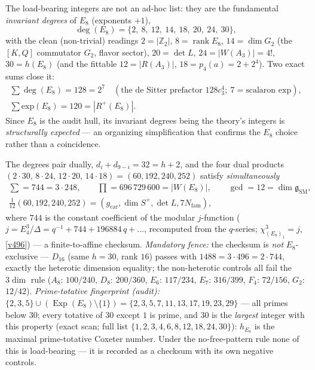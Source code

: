 \documentclass[11pt,a4paper]{article}
\newcommand{\gcar}{g_{\mathrm{car}}}
\newcommand{\Nfam}{N_{\mathrm{fam}}}
\newcommand{\cthree}{c_3}
\newcommand{\Z}{\mathbb{Z}}
\theoremstyle{definition}
\begin{document}
\begin{keybox}
The load-bearing integers are not an ad-hoc list: they are the fundamental \emph{invariant degrees} of $E_8$
(exponents $+1$),
\[
  \deg(E_8)=\{2,\ 8,\ 12,\ 14,\ 18,\ 20,\ 24,\ 30\},
\]
with the clean (non-trivial) readings $2{=}|\Z_2|$, $8{=}\operatorname{rank}E_8$, $14{=}\dim G_2$ (the $[K,Q]$
commutator $G_2$, flavor sector), $20{=}\det L$, $24{=}|W(A_3)|{=}4!$, $30{=}h(E_8)$ (and the fittable
$12{=}|R(A_3)|$, $18{=}p_4(a){=}2{+}2^4$). Two exact sums close it:
\[
  \begin{gathered}
  \textstyle\sum\deg(E_8)=128=2^{7}\quad(\text{the de Sitter prefactor }128\cthree^4;\ 7{=}\text{scalaron exp}),\\[2pt]
  \textstyle\sum\text{exp}(E_8)=120=|R^+(E_8)| .
  \end{gathered}
\]
Since $E_8$ is the audit hull, its invariant degrees being the theory's integers is \emph{structurally
expected} --- an organizing simplification that confirms the $E_8$ choice rather than a coincidence.
\end{keybox}

\begin{keybox}
The degrees pair dually, $d_i+d_{9-i}=32=h+2$, and the four dual products
$(2{\cdot}30,\,8{\cdot}24,\,12{\cdot}20,\,14{\cdot}18)=(60,192,240,252)$ satisfy \emph{simultaneously}
\[
  \begin{gathered}
  \textstyle\sum=744=3\cdot248,\qquad \prod=696\,729\,600=|W(E_8)|,\qquad \gcd=12=\dim\mathfrak g_{\mathrm{SM}},\\[2pt]
  \tfrac1{12}(60,192,240,252)=(\gcar,\dim S^+,\det L,7\Nfam),
  \end{gathered}
\]
where $744$ is the constant coefficient of the modular $j$-function ($j=E_4^3/\Delta=q^{-1}+744+196884\,q+\dots$,
recomputed from the $q$-series; $\chi_{(E_8)_1}^3=j$, \vref{v496}) --- a finite-to-affine checksum.
\emph{Mandatory fence:} the checksum is \emph{not} $E_8$-exclusive --- $D_{16}$ (same $h=30$, rank $16$)
passes with $1488=3\cdot496=2\cdot744$, exactly the heterotic dimension equality; the non-heterotic
controls all fail the $3\dim$ rule ($A_8$: $100/240$, $D_8$: $200/360$, $E_6$: $117/234$, $E_7$: $316/399$,
$F_4$: $72/156$, $G_2$: $12/42$). \emph{Prime-totative fingerprint (audit):}
$\{2,3,5\}\cup(\operatorname{Exp}(E_8)\setminus\{1\})=\{2,3,5,7,11,13,17,19,23,29\}$ --- all primes below
$30$; every totative of $30$ except $1$ is prime, and $30$ is the \emph{largest} integer with this property
(exact scan; full list $\{1,2,3,4,6,8,12,18,24,30\}$): $h_{E_8}$ is the maximal prime-totative Coxeter
number. Under the no-free-pattern rule none of this is load-bearing --- it is recorded as a checksum with
its own negative controls.
\end{keybox}
\end{document}
